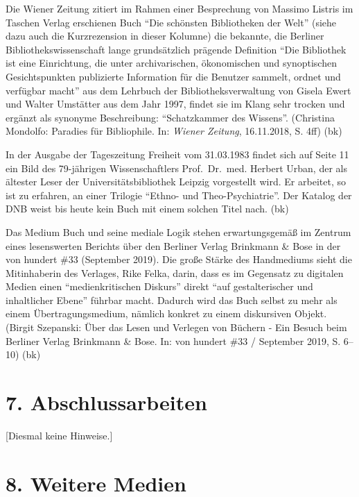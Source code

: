 \documentclass[a4paper,
fontsize=11pt,
oneside,
numbers=noperiodatend,
parskip=half-,
bibliography=totoc,
final
]{scrartcl}
\begin{document}
Die Wiener Zeitung zitiert im Rahmen einer Besprechung von Massimo
Listris im Taschen Verlag erschienen Buch \enquote{Die schönsten
Bibliotheken der Welt} (siehe dazu auch die Kurzrezension in dieser
Kolumne) die bekannte, die Berliner Bibliothekswissenschaft lange
grundsätzlich prägende Definition \enquote{Die Bibliothek ist eine
Einrichtung, die unter archivarischen, ökonomischen und synoptischen
Gesichtspunkten publizierte Information für die Benutzer sammelt, ordnet
und verfügbar macht} aus dem Lehrbuch der Bibliotheksverwaltung von
Gisela Ewert und Walter Umstätter aus dem Jahr 1997, findet sie im Klang
sehr trocken und ergänzt als synonyme Beschreibung:
\enquote{Schatzkammer des Wissens}. (Christina Mondolfo: Paradies für
Bibliophile. In: \emph{Wiener Zeitung}, 16.11.2018, S. 4ff) (bk)

In der Ausgabe der Tageszeitung Freiheit vom 31.03.1983 findet sich auf
Seite 11 ein Bild des 79-jährigen Wissenschaftlers Prof.~Dr.~med.
Herbert Urban, der als ältester Leser der Universitätsbibliothek Leipzig
vorgestellt wird. Er arbeitet, so ist zu erfahren, an einer Trilogie
\enquote{Ethno- und Theo-Psychiatrie}. Der Katalog der DNB weist bis
heute kein Buch mit einem solchen Titel nach. (bk)

Das Medium Buch und seine mediale Logik stehen erwartungsgemäß im
Zentrum eines lesenswerten Berichts über den Berliner Verlag Brinkmann
\& Bose in der von hundert \#33 (September 2019). Die große Stärke des
Handmediums sieht die Mitinhaberin des Verlages, Rike Felka, darin, dass
es im Gegensatz zu digitalen Medien einen \enquote{medienkritischen
Diskurs} direkt \enquote{auf gestalterischer und inhaltlicher Ebene}
führbar macht. Dadurch wird das Buch selbst zu mehr als einem
Übertragungsmedium, nämlich konkret zu einem diskursiven Objekt. (Birgit
Szepanski: Über das Lesen und Verlegen von Büchern - Ein Besuch beim
Berliner Verlag Brinkmann \& Bose. In: von hundert \#33 / September
2019, S. 6--10) (bk)

\hypertarget{abschlussarbeiten}{%
\section{7. Abschlussarbeiten}\label{abschlussarbeiten}}

{[}Diesmal keine Hinweise.{]}

\hypertarget{weitere-medien}{%
\section{8. Weitere Medien}\label{weitere-medien}}
\end{document}
